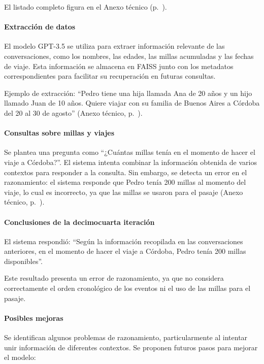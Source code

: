 El listado completo figura en el Anexo técnico (p.~\pageref{anexo:code-4-1-14-2}).

\paragraph{Extracción de datos}

El modelo GPT-3.5 se utiliza para extraer información relevante de las conversaciones, como los nombres, las edades, las millas acumuladas y las fechas de viaje. Esta información se almacena en FAISS junto con los metadatos correspondientes para facilitar su recuperación en futuras consultas.

Ejemplo de extracción: ``Pedro tiene una hija llamada Ana de 20 años y un hijo llamado Juan de 10 años. Quiere viajar con su familia de Buenos Aires a Córdoba del 20 al 30 de agosto'' (Anexo técnico, p.~\pageref{anexo:code-4-1-14-3}).

\paragraph{Consultas sobre millas y viajes}

Se plantea una pregunta como ``¿Cuántas millas tenía en el momento de hacer el viaje a Córdoba?''. El sistema intenta combinar la información obtenida de varios contextos para responder a la consulta. Sin embargo, se detecta un error en el razonamiento: el sistema responde que Pedro tenía 200 millas al momento del viaje, lo cual es incorrecto, ya que las millas se usaron para el pasaje (Anexo técnico, p.~\pageref{anexo:code-4-1-14-4}).

\paragraph{Conclusiones de la decimocuarta iteración}

El sistema respondió: ``Según la información recopilada en las conversaciones anteriores, en el momento de hacer el viaje a Córdoba, Pedro tenía 200 millas disponibles''. 

Este resultado presenta un error de razonamiento, ya que no considera correctamente el orden cronológico de los eventos ni el uso de las millas para el pasaje.

\paragraph{Posibles mejoras}

Se identifican algunos problemas de razonamiento, particularmente al intentar unir información de diferentes contextos. Se proponen futuros pasos para mejorar el modelo:


